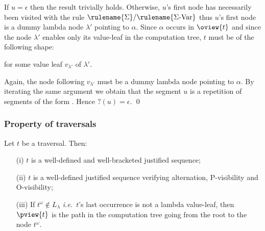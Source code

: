 If $u=\epsilon$  then the result trivially holds. Otherwise, $u$'s
first node has necessarily been visited with the rule
$\rulename{\Sigma}/\rulename{\Sigma\mbox{-Var}}$ thus $u$'s first
node is a dummy lambda node $\lambda'$ pointing to $\alpha$. Since
$\alpha$ occurs in $\oview{t}$ and since the node $\lambda'$ enables
only its value-leaf in the computation tree, $t$ must be of the
following shape:

for some value leaf $v_{\lambda'}$ of $\lambda'$.

Again, the node following $v_{\lambda'}$ must be a dummy lambda node
pointing to $\alpha$. By iterating the same argument we obtain that
the segment $u$ is a repetition of segments of the form
.
Hence $?(u)=\epsilon$. \qed



\subsubsection{Property of traversals}

\begin{proposition}
\label{prop:pviewtrav_is_path}
Let $t$ be a traversal. Then:
\begin{itemize}
\item[(i)] $t$ is a well-defined and well-bracketed justified sequence;
\item[(ii)] $t$ is a well-defined justified sequence verifying alternation, P-visibility and O-visibility;
\item[(iii)] If $t^\omega \not\in L_\lambda$ {\it i.e.}~$t$'s last occurrence is not a lambda value-leaf, then $\pview{t}$ is the path in the computation tree going from the root to the node $t^\omega$.
\end{itemize}
\end{proposition}

